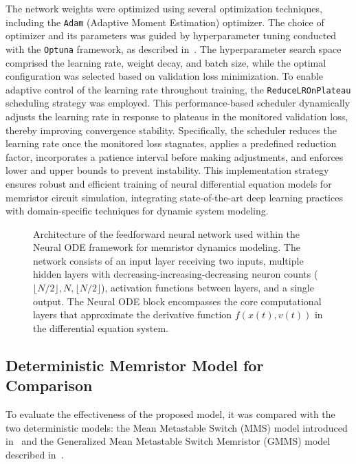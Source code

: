 \documentclass[11pt, oneside]{article}
\newcommand{\ua}{v}
\newcommand{\xw}{x}
\begin{document}
The network weights were optimized using several optimization techniques, including the \texttt{Adam} (Adaptive Moment Estimation) optimizer. The choice of optimizer and its parameters was guided by hyperparameter tuning conducted with the \texttt{Optuna} framework, as described in~\cite{Akiba2019}. The hyperparameter search space comprised the learning rate, weight decay, and batch size, while the optimal configuration was selected based on validation loss minimization. To enable adaptive control of the learning rate throughout training, the \texttt{ReduceLROnPlateau} scheduling strategy was employed. This performance-based scheduler dynamically adjusts the learning rate in response to plateaus in the monitored validation loss, thereby improving convergence stability. Specifically, the scheduler reduces the learning rate once the monitored loss stagnates, applies a predefined reduction factor, incorporates a patience interval before making adjustments, and enforces lower and upper bounds to prevent instability. This implementation strategy ensures robust and efficient training of neural differential equation models for memristor circuit simulation, integrating state-of-the-art deep learning practices with domain-specific techniques for dynamic system modeling.

\begin{figure}[ht!]
    \centering
    \resizebox{\linewidth}{!}{%
        
    }
    \caption{Architecture of the feedforward neural network used within the Neural ODE framework for memristor dynamics modeling. The network consists of an input layer receiving two inputs, multiple hidden layers with decreasing-increasing-decreasing neuron counts ($\lfloor N/2 \rfloor, N, \lfloor N/2 \rfloor$), activation functions between layers, and a single output. The Neural ODE block encompasses the core computational layers that approximate the derivative function $f(\xw(t), \ua(t))$ in the differential equation system.}

    \label{fig:nn-arch}
\end{figure}


\subsection{Deterministic Memristor Model for Comparison}

To evaluate the effectiveness of the proposed model, it was compared with the two deterministic models: the Mean Metastable Switch (MMS) model introduced in~\cite{Minati2020} and the  Generalized Mean Metastable Switch Memristor (GMMS) model described in~\cite{Molter2016, Ostrovskii2021}.
\end{document}
